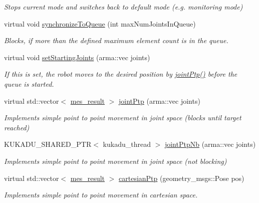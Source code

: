 \begin{DoxyCompactItemize}
\begin{DoxyCompactList}\small\item\em Stops current mode and switches back to default mode (e.\+g. monitoring mode) \end{DoxyCompactList}\item 
virtual void \hyperlink{classkukadu_1_1ControlQueue_a324484e79a5505656a32d9f32054e5d0}{synchronize\+To\+Queue} (int max\+Num\+Joints\+In\+Queue)
\begin{DoxyCompactList}\small\item\em Blocks, if more than the defined maximum element count is in the queue. \end{DoxyCompactList}\item 
virtual void \hyperlink{classkukadu_1_1ControlQueue_a225130ca0fa4a22e98cc0e5679917841}{set\+Starting\+Joints} (arma\+::vec joints)
\begin{DoxyCompactList}\small\item\em If this is set, the robot moves to the desired position by \hyperlink{classkukadu_1_1ControlQueue_ad11059100321b24a1af8ef7de8314353}{joint\+Ptp()} before the queue is started. \end{DoxyCompactList}\item 
virtual std\+::vector$<$ \hyperlink{structmes__result}{mes\+\_\+result} $>$ \hyperlink{classkukadu_1_1ControlQueue_ad11059100321b24a1af8ef7de8314353}{joint\+Ptp} (arma\+::vec joints)
\begin{DoxyCompactList}\small\item\em Implements simple point to point movement in joint space (blocks until target reached) \end{DoxyCompactList}\item 
K\+U\+K\+A\+D\+U\+\_\+\+S\+H\+A\+R\+E\+D\+\_\+\+P\+TR$<$ kukadu\+\_\+thread $>$ \hyperlink{classkukadu_1_1ControlQueue_aaf35ae626b08ac53508acdc84ab58c8f}{joint\+Ptp\+Nb} (arma\+::vec joints)
\begin{DoxyCompactList}\small\item\em Implements simple point to point movement in joint space (not blocking) \end{DoxyCompactList}\item 
virtual std\+::vector$<$ \hyperlink{structmes__result}{mes\+\_\+result} $>$ \hyperlink{classkukadu_1_1ControlQueue_a1bfa23a8ce6319f6ef0ed9208e896054}{cartesian\+Ptp} (geometry\+\_\+msgs\+::\+Pose pos)
\begin{DoxyCompactList}\small\item\em Implements simple point to point movement in cartesian space. \end{DoxyCompactList}\item 

\end{DoxyCompactItemize}
